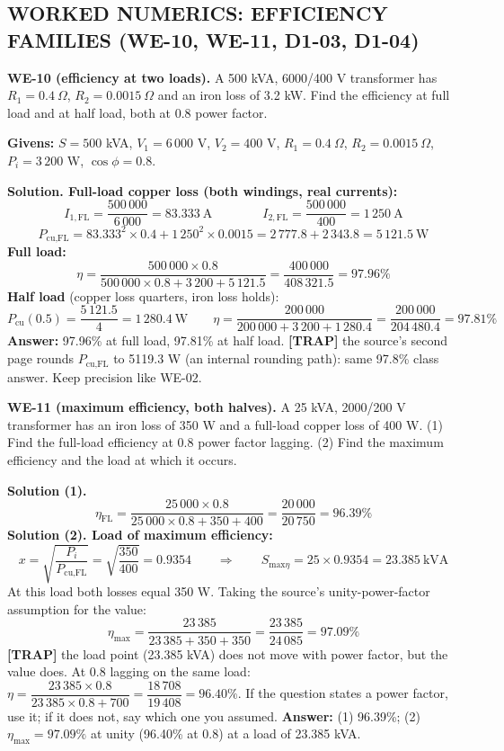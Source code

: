 \documentclass[11pt]{article}
\newcommand{\tagline}[1]{\textbf{\color{copper}#1}}
\newcommand{\trap}[1]{\vspace{2pt}\textbf{\color{red}[TRAP]} #1}
\begin{document}
\hrulefill
\subsection*{\color{copper}WORKED NUMERICS: EFFICIENCY FAMILIES (WE-10, WE-11, D1-03, D1-04)}

\tagline{WE-10 (efficiency at two loads).} A 500 kVA, 6000/400 V transformer has $R_1 = 0.4\ \Omega$, $R_2 = 0.0015\ \Omega$ and an iron loss of 3.2 kW. Find the efficiency at full load and at half load, both at 0.8 power factor.

\textbf{Givens:} $S = 500$ kVA, $V_1 = 6\,000$ V, $V_2 = 400$ V, $R_1 = 0.4\ \Omega$, $R_2 = 0.0015\ \Omega$, $P_i = 3\,200$ W, $\cos\phi = 0.8$.

\textbf{Solution. Full-load copper loss (both windings, real currents):}
\[
I_{1,\text{FL}} = \frac{500\,000}{6\,000} = 83.333\ \text{A}
\qquad\qquad
I_{2,\text{FL}} = \frac{500\,000}{400} = 1\,250\ \text{A}
\]
\[
P_{\text{cu,FL}} = 83.333^{2} \times 0.4 + 1\,250^{2} \times 0.0015 = 2\,777.8 + 2\,343.8 = 5\,121.5\ \text{W}
\]
\textbf{Full load:}
\[
\eta = \frac{500\,000 \times 0.8}{500\,000 \times 0.8 + 3\,200 + 5\,121.5} = \frac{400\,000}{408\,321.5} = 97.96\%
\]
\textbf{Half load} (copper loss quarters, iron loss holds):
\[
P_{\text{cu}}(0.5) = \frac{5\,121.5}{4} = 1\,280.4\ \text{W}
\qquad
\eta = \frac{200\,000}{200\,000 + 3\,200 + 1\,280.4} = \frac{200\,000}{204\,480.4} = 97.81\%
\]
\textbf{Answer:} 97.96\% at full load, 97.81\% at half load. \trap{the source's second page rounds $P_{\text{cu,FL}}$ to 5119.3 W (an internal rounding path): same 97.8\% class answer. Keep precision like WE-02.}

\vspace{2pt}

\tagline{WE-11 (maximum efficiency, both halves).} A 25 kVA, 2000/200 V transformer has an iron loss of 350 W and a full-load copper loss of 400 W. (1) Find the full-load efficiency at 0.8 power factor lagging. (2) Find the maximum efficiency and the load at which it occurs.

\textbf{Solution (1).}
\[
\eta_{\text{FL}} = \frac{25\,000 \times 0.8}{25\,000 \times 0.8 + 350 + 400} = \frac{20\,000}{20\,750} = 96.39\%
\]
\textbf{Solution (2). Load of maximum efficiency:}
\[
x = \sqrt{\frac{P_i}{P_{\text{cu,FL}}}} = \sqrt{\frac{350}{400}} = 0.9354
\qquad\Longrightarrow\qquad
S_{\text{max}\eta} = 25 \times 0.9354 = 23.385\ \text{kVA}
\]
At this load both losses equal 350 W. Taking the source's unity-power-factor assumption for the value:
\[
\eta_{\text{max}} = \frac{23\,385}{23\,385 + 350 + 350} = \frac{23\,385}{24\,085} = 97.09\%
\]
\trap{the load point (23.385 kVA) does not move with power factor, but the value does. At 0.8 lagging on the same load: $\eta = \dfrac{23\,385 \times 0.8}{23\,385 \times 0.8 + 700} = \dfrac{18\,708}{19\,408} = 96.40\%$. If the question states a power factor, use it; if it does not, say which one you assumed.}
\textbf{Answer:} (1) 96.39\%; (2) $\eta_{\text{max}} = 97.09\%$ at unity (96.40\% at 0.8) at a load of 23.385 kVA.
\end{document}
